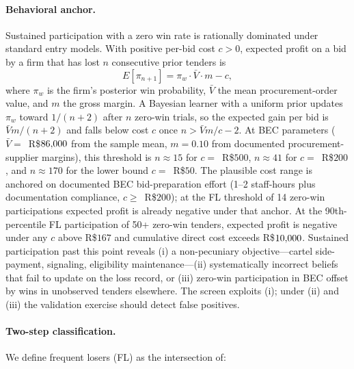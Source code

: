 \paragraph{Behavioral anchor.}
Sustained participation with a zero win rate is rationally
dominated under standard entry models. With positive per-bid
cost $c > 0$, expected profit on a bid by a firm that has lost
$n$ consecutive prior tenders is
\[
  E[\pi_{n+1}] = \pi_w \cdot \bar{V} \cdot m - c,
\]
where $\pi_w$ is the firm's posterior win probability, $\bar{V}$
the mean procurement-order value, and $m$ the gross margin. A
Bayesian learner with a uniform prior updates $\pi_w$ toward
$1/(n+2)$ after $n$ zero-win trials, so the expected gain per
bid is $\bar{V} m / (n+2)$ and falls below cost $c$ once
$n > \bar{V} m / c - 2$. At BEC parameters
($\bar{V} = $~R\$$86{,}000$ from the sample mean, $m = 0.10$
from documented procurement-supplier margins), this threshold is
$n \approx 15$ for $c = $~R\$$500$, $n \approx 41$ for
$c = $~R\$$200$, and $n \approx 170$ for the lower bound
$c = $~R\$$50$. The plausible cost range is anchored on
documented BEC bid-preparation effort (1--2 staff-hours plus
documentation compliance, $c \geq $~R\$$200$); at the FL
threshold of 14 zero-win participations expected profit is
already negative under that anchor. At the 90th-percentile FL
participation of 50+ zero-win tenders, expected profit is
negative under any $c$ above R\$$167$ and cumulative direct
cost exceeds R\$$10{,}000$. Sustained participation past this
point reveals (i) a non-pecuniary objective---cartel
side-payment, signaling, eligibility maintenance---(ii)
systematically incorrect beliefs that fail to update on the
loss record, or (iii) zero-win participation in BEC offset by
wins in unobserved tenders elsewhere. The screen exploits (i);
under (ii) and (iii) the validation exercise should detect
false positives.

\paragraph{Two-step classification.}
We define frequent losers (FL) as the intersection of:

